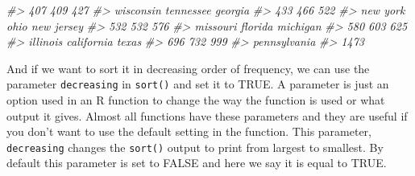 \documentclass[
]{krantz}
\makeatletter
\newenvironment{Shaded}{\begin{snugshade}}{\end{snugshade}}
\newcommand{\CommentTok}[1]{\textcolor[rgb]{0.37,0.37,0.37}{\textit{#1}}}
\newenvironment{kframe}{%
\medskip{}
\setlength{\fboxsep}{.8em}
 \def\at@end@of@kframe{}%
 \ifinner\ifhmode%
  \def\at@end@of@kframe{\end{minipage}}%
  \begin{minipage}{\columnwidth}%
 \fi\fi%
 \def\FrameCommand##1{\hskip\@totalleftmargin \hskip-\fboxsep
 \colorbox{shadecolor}{##1}\hskip-\fboxsep
     \hskip-\linewidth \hskip-\@totalleftmargin \hskip\columnwidth}%
 \MakeFramed {\advance\hsize-\width
   \@totalleftmargin\z@ \linewidth\hsize
   \@setminipage}}%
 {\par\unskip\endMakeFramed%
 \at@end@of@kframe}
\renewenvironment{Shaded}{\begin{kframe}}{\end{kframe}}
\makeatother
\begin{document}
\begin{Shaded}
\begin{Highlighting}[]
\CommentTok{\#\textgreater{}                  407                  409                  427 }
\CommentTok{\#\textgreater{}            wisconsin            tennessee              georgia }
\CommentTok{\#\textgreater{}                  433                  466                  522 }
\CommentTok{\#\textgreater{}             new york                 ohio           new jersey }
\CommentTok{\#\textgreater{}                  532                  532                  576 }
\CommentTok{\#\textgreater{}             missouri              florida             michigan }
\CommentTok{\#\textgreater{}                  580                  603                  625 }
\CommentTok{\#\textgreater{}             illinois           california                texas }
\CommentTok{\#\textgreater{}                  696                  732                  999 }
\CommentTok{\#\textgreater{}         pennsylvania }
\CommentTok{\#\textgreater{}                 1473}
\end{Highlighting}
\end{Shaded}

And if we want to sort it in decreasing order of frequency, we can use the parameter \texttt{decreasing} in \texttt{sort()} and set it to TRUE. A parameter is just an option used in an R function to change the way the function is used or what output it gives. Almost all functions have these parameters and they are useful if you don't want to use the default setting in the function. This parameter, \texttt{decreasing} changes the \texttt{sort()} output to print from largest to smallest. By default this parameter is set to FALSE and here we say it is equal to TRUE.
\end{document}
